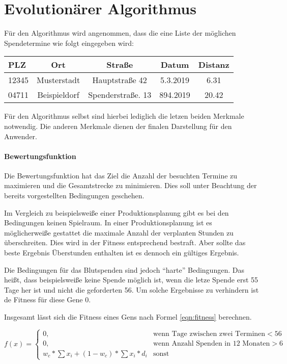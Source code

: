 \section{Evolutionärer Algorithmus}\label{sec:evol-alg}
Für den Algorithmus wird angenommen,
dass die eine Liste der möglichen Spendetermine wie folgt eingegeben wird:
\begin{center}
    \begin{tabular}{l|c|c|c|c}
        PLZ     & Ort               &  Straße               & Datum     & Distanz   \\
        \hline
        12345   & Musterstadt       & Hauptstraße 42        & 5.3.2019  & 6.31      \\
        04711   & Beispieldorf      & Spenderstraße. 13     & 894.2019  & 20.42     \\
    \end{tabular}
\end{center}

Für den Algorithmus selbst sind hierbei lediglich die letzen beiden Merkmale notwendig.
Die anderen Merkmale dienen der finalen Darstellung für den Anwender.

\paragraph{Bewertungsfunktion}
Die Bewertungsfunktion hat das Ziel die Anzahl der besuchten Termine zu maximieren und die Gesamtstrecke zu minimieren.
Dies soll unter Beachtung der bereits vorgestellten Bedingungen geschehen.

Im Vergleich zu beispielsweiße einer Produktionsplanung gibt es bei den Bedingungen keinen Spielraum.
In einer Produktionsplanung ist es möglicherweiße gestattet die maximale Anzahl der verplanten Stunden zu überschreiten.
Dies wird in der Fitness entsprechend bestraft. Aber sollte das beste Ergebnis Überstunden enthalten ist es dennoch ein gültiges Ergebnis.

Die Bedingungen für das Blutspenden sind jedoch \enquote{harte} Bedingungen.
Das heißt, dass beispielsweiße keine Spende möglich ist, wenn die letze Spende erst 55 Tage her ist und nicht die geforderten 56.
Um solche Ergebnisse zu verhindern ist de Fitness für diese Gene $0$.

Insgesamt lässt sich die Fitness eines Gens nach Formel \ref{eqn:fitness} berechnen.

\begin{equation}
    \label{eqn:fitness}
    f(x)=
    \begin{cases}
        0,              & \text{wenn Tage zwischen zwei Terminen} < 56 \\
        0,              & \text{wenn Anzahl Spenden in 12 Monaten} > 6 \\
        w_c * \sum x_i + (1 - w_c) * \sum x_i * d_i & \text{sonst}
    \end{cases}
\end{equation}


